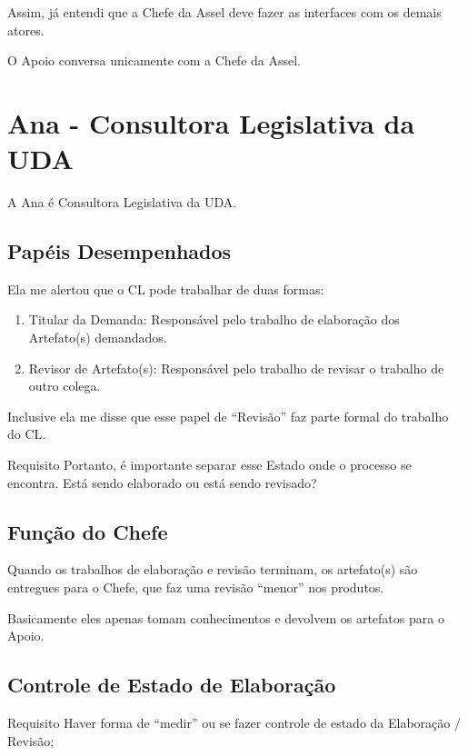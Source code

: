 Assim, já entendi que a Chefe da Assel deve fazer as interfaces com os demais atores.

O Apoio conversa unicamente com a Chefe da Assel.  

 


\section{Ana - Consultora Legislativa da UDA}

A Ana é Consultora Legislativa da UDA.

\subsection{Papéis Desempenhados}

Ela me alertou que o CL pode trabalhar de duas formas:

\begin{enumerate}
	\item Titular da Demanda: Responsável pelo trabalho de elaboração dos Artefato(s) demandados.
	
	\item Revisor de Artefato(s): Responsável pelo trabalho de revisar o trabalho de outro colega.
\end{enumerate}

Inclusive ela me disse que esse papel de ``Revisão'' faz parte formal do trabalho do CL.

\begin{requisito}{Requisito}
	Portanto, é importante separar esse Estado onde o processo se encontra. Está sendo elaborado ou está sendo revisado?
\end{requisito}

\subsection{Função do Chefe}

Quando os trabalhos de elaboração e revisão terminam, os artefato(s) são entregues para o Chefe, que faz uma revisão ``menor'' nos produtos.

Basicamente eles apenas tomam conhecimentos e devolvem os artefatos para o Apoio.

\subsection{Controle de Estado de Elaboração}


\begin{requisito}{Requisito}
	Haver forma de ``medir'' ou se fazer controle de estado da Elaboração / Revisão;	
\end{requisito}


